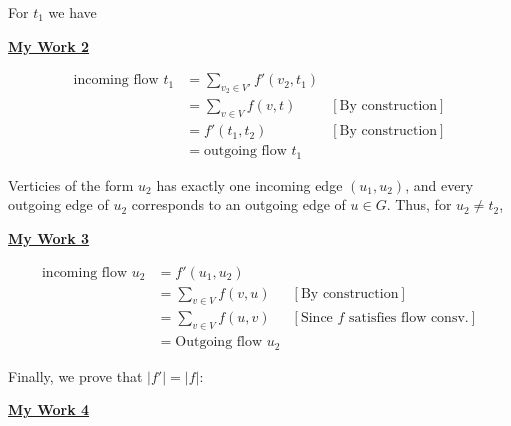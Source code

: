 \documentclass[12pt]{article}
\begin{document}
\begin{enumerate}[1.]
\begin{enumerate}[a)]
\begin{mdframed}
        \end{mdframed}

        \bigskip

        For $t_1$ we have

        \begin{mdframed}
        \underline{\textbf{My Work 2}}

        \bigskip

        \begin{align}
        \text{incoming flow $t_1$} &= \sum\limits_{v_2 \in V'} f'(v_2, t_1)\\
        &= \sum\limits_{v \in V} f(v, t) & [\text{By construction}]\\
        &= f'(t_1, t_2) & [\text{By construction}]\\
        &= \text{outgoing flow $t_1$}
        \end{align}

        \end{mdframed}

        \bigskip

        Verticies of the form $u_2$ has exactly one incoming edge $(u_1, u_2)$, and
        every outgoing edge of $u_2$ corresponds to an outgoing edge of $u \in G$. Thus,
        for $u_2 \neq t_2$,

        \begin{mdframed}
        \underline{\textbf{My Work 3}}

        \begin{align}
        \text{incoming flow $u_2$} &= f'(u_1, u_2)\\
        &= \sum\limits_{v \in V} f(v,u) & [\text{By construction}]\\
        &= \sum\limits_{v \in V} f(u,v) & [\text{Since $f$ satisfies flow consv.}]\\
        &= \text{Outgoing flow $u_2$}
        \end{align}

        \end{mdframed}

        \bigskip

        Finally, we prove that $\lvert f' \rvert = \lvert f \rvert$:

        \bigskip

        \begin{mdframed}
        \underline{\textbf{My Work 4}}

        \end{mdframed}


\end{enumerate}
\end{enumerate}
\end{document}

